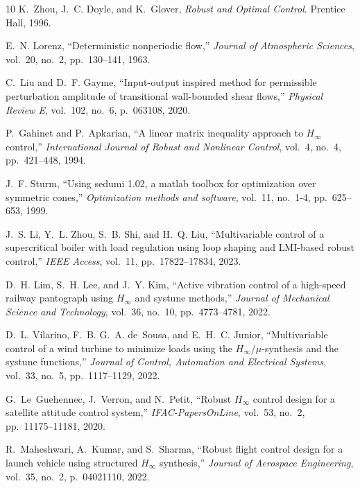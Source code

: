 \documentclass[12pt, a4paper,reqno]{amsart}
\theoremstyle{definition}
\begin{document}
\begin{thebibliography}{10}
K.~Zhou, J.~C. Doyle, and K.~Glover, {\em {Robust and Optimal Control}}.
\newblock Prentice Hall, 1996.

E.~N. Lorenz, ``Deterministic nonperiodic flow,'' {\em Journal of {A}tmospheric
  {S}ciences}, vol.~20, no.~2, pp.~130--141, 1963.

C.~Liu and D.~F. Gayme, ``Input-output inspired method for permissible
  perturbation amplitude of transitional wall-bounded shear flows,'' {\em
  Physical Review E}, vol.~102, no.~6, p.~063108, 2020.

P.~Gahinet and P.~Apkarian, ``A linear matrix inequality approach to
  {$H_\infty$} control,'' {\em International Journal of Robust and Nonlinear
  Control}, vol.~4, no.~4, pp.~421--448, 1994.

J.~F. Sturm, ``Using sedumi 1.02, a matlab toolbox for optimization over
  symmetric cones,'' {\em Optimization methods and software}, vol.~11, no.~1-4,
  pp.~625--653, 1999.

J.~S. Li, Y.~L. Zhou, S.~B. Shi, and H.~Q. Liu, ``Multivariable control of a
  supercritical boiler with load regulation using loop shaping and {LMI}-based
  robust control,'' {\em IEEE Access}, vol.~11, pp.~17822--17834, 2023.

D.~H. Lim, S.~H. Lee, and J.~Y. Kim, ``Active vibration control of a high-speed
  railway pantograph using {$H_\infty$} and systune methods,'' {\em Journal of
  Mechanical Science and Technology}, vol.~36, no.~10, pp.~4773--4781, 2022.

D.~L. Vilarino, F.~B. G.~A. de~Sousa, and E.~H.~C. Junior, ``Multivariable
  control of a wind turbine to minimize loads using the
  {$H_\infty$}/{$\mu$}-synthesis and the systune functions,'' {\em Journal of
  Control, Automation and Electrical Systems}, vol.~33, no.~5, pp.~1117--1129,
  2022.

G.~Le~Guehennec, J.~Verron, and N.~Petit, ``Robust {$H_\infty$} control design
  for a satellite attitude control system,'' {\em IFAC-PapersOnLine}, vol.~53,
  no.~2, pp.~11175--11181, 2020.

R.~Maheshwari, A.~Kumar, and S.~Sharma, ``Robust flight control design for a
  launch vehicle using structured {$H_\infty$} synthesis,'' {\em Journal of
  Aerospace Engineering}, vol.~35, no.~2, p.~04021110, 2022.


\end{thebibliography}
\end{document}
